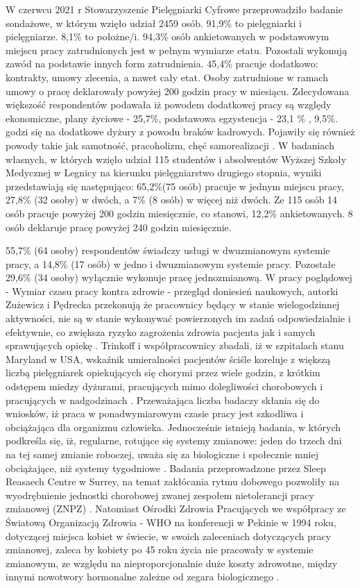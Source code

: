 \documentclass[a4paper,12pt,twoside,openany]{report}
\begin{document}
W czerwcu 2021 r Stowarzyszenie Pielęgniarki Cyfrowe przeprowadziło badanie sondażowe, w którym wzięło udział 2459 osób. 91,9\% to pielęgniarki i pielęgniarze. 8,1\% to położne/i.   94,3\%   osób ankietowanych w podstawowym miejscu pracy zatrudnionych jest w pełnym wymiarze etatu. Pozostali wykonują zawód na podstawie innych form zatrudnienia. 45,4\%  pracuje dodatkowo: kontrakty, umowy zlecenia, a nawet cały etat. Osoby zatrudnione w ramach umowy o pracę deklarowały powyżej 200 godzin pracy w miesiącu. Zdecydowana większość respondentów podawała iż powodem dodatkowej pracy są względy ekonomiczne, plany życiowe - 25,7\%,  podstawowa egzystencja -  23,1
\% , 9,5\%. godzi się na dodatkowe dyżury z powodu braków kadrowych. Pojawiły się również powody takie jak samotność, pracoholizm, chęć samorealizacji \cite{cyfrowe}. W badaniach własnych, w których wzięło udział 115 studentów i absolwentów Wyższej Szkoły Medycznej  w Legnicy na kierunku pielęgniarstwo drugiego stopnia, wyniki  przedstawiają się następująco: 65,2\%(75 osób) pracuje w jednym miejscu pracy, 27,8\% (32 osoby) w dwóch, a 7\% (8 osób) w więcej niż dwóch.  Ze 115 osób 14 osób pracuje powyżej 200 godzin miesięcznie, co stanowi, 12,2\% ankietowanych. 8 osób deklaruje pracę powyżej  240 godzin miesięcznie.

55,7\%  (64 osoby) respondentów świadczy usługi w dwuzmianowym systemie pracy, a 14,8\% (17 osób) w jedno i dwuzmianowym systemie pracy. Pozostałe 29,6\% (34 osoby) wyłącznie wykonuje pracę jednozmianową. W pracy poglądowej - Wymiar czasu pracy kontra zdrowie - przegląd doniesień naukowych, autorki Zużewicz i  Pędrecka przekonują że pracownicy będący w stanie wielogodzinnej aktywności, nie są w stanie wykonywać powierzonych im zadań odpowiedzialnie i efektywnie, co zwiększa ryzyko zagrożenia zdrowia pacjenta jak i samych sprawujących opiekę \cite{kontra}. Trinkoff i współpracownicy zbadali, iż w szpitalach stanu Maryland w USA, wskaźnik umieralności pacjentów ściśle koreluje z większą liczbą pielęgniarek opiekujących się chorymi przez wiele godzin, z krótkim odstępem miedzy dyżurami, pracujących mimo dolegliwości chorobowych i pracujących w nadgodzinach \cite{trinkoff}. Przeważająca liczba badaczy skłania się do wniosków, iż praca w ponadwymiarowym czasie pracy jest szkodliwa i obciążająca dla organizmu człowieka. Jednocześnie istnieją badania, w których podkreśla się, iż,  regularne, rotujące się systemy zmianowe: jeden do trzech dni na tej samej zmianie roboczej, uważa się za biologiczne i społecznie mniej obciążające, niż systemy tygodniowe \cite{konflikt}. Badania przeprowadzone przez Sleep Reasaech Centre w Surrey, na temat zakłócania rytmu dobowego pozwoliły na wyodrębnienie jednostki chorobowej zwanej zespołem nietolerancji pracy zmianowej (ZNPZ) \cite{znpz}.  Natomiast  Ośrodki Zdrowia Pracujących  we  współpracy ze Światową Organizacją Zdrowia - WHO  na konferencji w Pekinie w 1994 roku, dotyczącej miejsca kobiet w świecie, w swoich zaleceniach dotyczących pracy zmianowej, zaleca by kobiety po 45 roku życia nie pracowały w systemie zmianowym, ze względu na nieproporcjonalnie duże koszty zdrowotne, między innymi nowotwory hormonalne zależne od zegara biologicznego \cite{zalecenia}.
\end{document}
